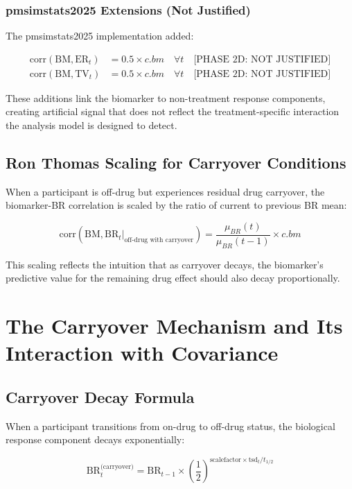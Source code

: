 \documentclass[12pt,a4paper]{article}
\begin{document}
\subsubsection{pmsimstats2025 Extensions (Not Justified)}

The pmsimstats2025 implementation added:

\begin{align}
\text{corr}(\text{BM}, \text{ER}_t) &= 0.5 \times c.bm \quad \forall t \quad \text{[PHASE 2D: NOT JUSTIFIED]}\\
\text{corr}(\text{BM}, \text{TV}_t) &= 0.5 \times c.bm \quad \forall t \quad \text{[PHASE 2D: NOT JUSTIFIED]}
\end{align}

These additions link the biomarker to non-treatment response components, creating artificial signal that does not reflect the treatment-specific interaction the analysis model is designed to detect.

\subsection{Ron Thomas Scaling for Carryover Conditions}

When a participant is off-drug but experiences residual drug carryover, the biomarker-BR correlation is scaled by the ratio of current to previous BR mean:

\begin{equation}
\text{corr}(\text{BM}, \text{BR}_t|_{\text{off-drug with carryover}}) = \frac{\mu_{BR}(t)}{\mu_{BR}(t-1)} \times c.bm
\end{equation}

This scaling reflects the intuition that as carryover decays, the biomarker's predictive value for the remaining drug effect should also decay proportionally.

\section{The Carryover Mechanism and Its Interaction with Covariance}

\subsection{Carryover Decay Formula}

When a participant transitions from on-drug to off-drug status, the biological response component decays exponentially:

\begin{equation}
\text{BR}_t^{\text{(carryover)}} = \text{BR}_{t-1} \times \left(\frac{1}{2}\right)^{\text{scalefactor} \times \text{tsd}_t / t_{1/2}}
\end{equation}
\end{document}
